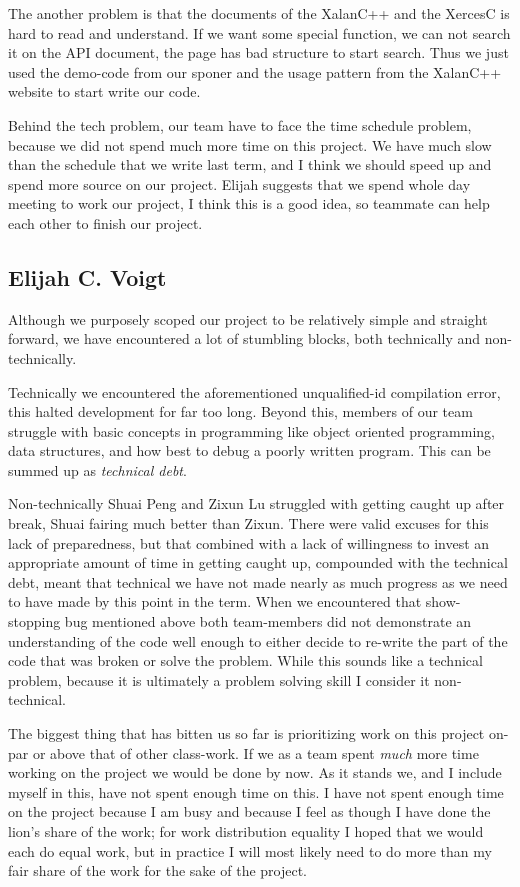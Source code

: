The another problem is that the documents of the XalanC++ and the XercesC is hard to read and understand.
If we want some special function, we can not search it on the API document, the page has bad structure to start search.
Thus we just used the demo-code from our sponer and the usage pattern from the XalanC++ website to start write our code.

Behind the tech problem, our team have to face the time schedule problem, because we did not spend much more time on this project.
We have much slow than the schedule that we write last term, and I think we should speed up and spend more source on our project.
Elijah suggests that we spend whole day meeting to work our project, I think this is a good idea, so teammate can help each other to finish our project.


\subsection{Elijah C. Voigt}

Although we purposely scoped our project to be relatively simple and straight forward, we have encountered a lot of stumbling blocks, both technically and non-technically.

Technically we encountered the aforementioned unqualified-id compilation error, this halted development for far too long.
Beyond this, members of our team struggle with basic concepts in programming like object oriented programming, data structures, and how best to debug a poorly written program.
This can be summed up as \textit{technical debt}.

Non-technically Shuai Peng and Zixun Lu struggled with getting caught up after break, Shuai fairing much better than Zixun.
There were valid excuses for this lack of preparedness, but that combined with a lack of willingness to invest an appropriate amount of time in getting caught up, compounded with the technical debt, meant that technical we have not made nearly as much progress as we need to have made by this point in the term.
When we encountered that show-stopping bug mentioned above both team-members did not demonstrate an understanding of the code well enough to either decide to re-write the part of the code that was broken or solve the problem.
While this sounds like a technical problem, because it is ultimately a problem solving skill I consider it non-technical.

The biggest thing that has bitten us so far is prioritizing work on this project on-par or above that of other class-work.
If we as a team spent \textit{much} more time working on the project we would be done by now.
As it stands we, and I include myself in this, have not spent enough time on this.
I have not spent enough time on the project because I am busy and because I feel as though I have done the lion's share of the work; for work distribution equality I hoped that we would each do equal work, but in practice I will most likely need to do more than my fair share of the work for the sake of the project.

